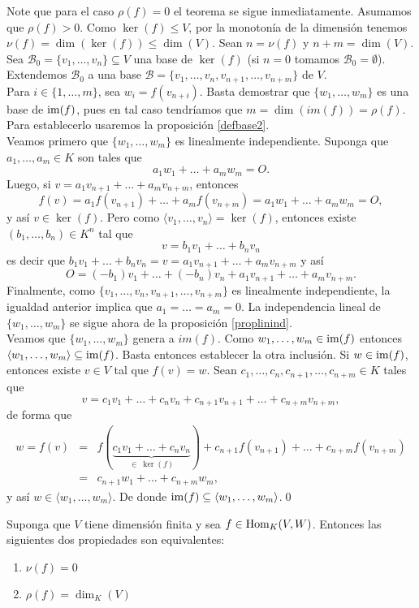 \dem Note que para el caso $\rho(f)=0$ el teorema se sigue inmediatamente. Asumamos que $\rho(f)>0$. Como $\ker(f)\le V$, por la monoton\'ia de la dimensi\'on tenemos $\nu(f)=\dim\left(\ker(f)\right)\le\dim(V)$. Sean $n=\nu(f)$ y $n+m=\dim (V)$. Sea $\mathcal{B}_0=\{v_1,\ldots,v_n\}\subseteq V$ una base de $\ker(f)$ (si $n=0$ tomamos $\mathcal{B}_0=\emptyset$). Extendemos $\mathcal{B}_0$ a una base $\mathcal{B}=\{v_1,\ldots,v_n,v_{n+1},\ldots,v_{n+m}\}$ de $V$.\\
Para $i\in\{1,\ldots,m\}$, sea $w_i=f(v_{n+i})$. Basta demostrar que $\{w_1,\ldots,w_m\}$ es una base de $\operatorname{im}(f)$, pues en tal caso tendr\'iamos que $m=\dim\left(im(f)\right)=\rho(f)$. Para establecerlo usaremos la proposici\'on \ref{defbase2}.\\
Veamos primero que $\{w_1,\ldots,w_m\}$ es linealmente independiente. Suponga que $a_1,\ldots,a_m\in K$ son tales que
\[
a_1w_1+\ldots+a_mw_m=O.
\]
Luego, si $v=a_1v_{n+1}+\ldots+a_mv_{n+m}$, entonces
\[
f(v)=a_1f(v_{n+1})+\ldots+a_mf(v_{n+m})=a_1w_1+\ldots+a_mw_m=O,
\]
y as\'i $v\in\ker(f)$. Pero como $\langle v_1,\ldots,v_n\rangle=\ker(f)$, entonces existe $(b_1,\ldots,b_n)\in K^n$ tal que
\[
v=b_1v_1+\ldots+b_nv_n
\]
es decir que $b_1v_1+\ldots+b_nv_n=v=a_1v_{n+1}+\ldots+a_mv_{n+m}$ y as\'i
\[
O=(-b_1)v_1+\ldots+(-b_n)v_n+a_1v_{n+1}+\ldots+a_mv_{n+m}.
\]
Finalmente, como $\{v_1,\ldots,v_n,v_{n+1},\ldots,v_{n+m}\}$ es linealmente independiente, la igualdad anterior implica que $a_1=\ldots=a_m=0$. La independencia lineal de $\{w_1,\ldots,w_m\}$ se sigue ahora de la  proposici\'on \ref{proplinind}.\\
Veamos que  $\{w_1,\ldots,w_m\}$ genera a $im(f)$. Como $w_1,\ldots,w_m\in \operatorname{im}(f)$ entonces $\langle w_1,\ldots,w_m\rangle\subseteq\operatorname{im}(f)$. Basta entonces establecer la otra inclusi\'on. Si $w\in\operatorname{im}(f)$, entonces existe $v\in V$ tal que $f(v)=w$. Sean $c_1,\ldots,c_n,c_{n+1},\ldots,c_{n+m}\in K$ tales que 
\[
v=c_1v_1+\ldots+c_nv_n+c_{n+1}v_{n+1}+\ldots+c_{n+m}v_{n+m},
\]
de forma que
\begin{eqnarray*}
w=f(v) & = & f(\underbrace{c_1v_1+\ldots+c_nv_n}_{\in\ \ker(f)})+c_{n+1}f(v_{n+1})+\ldots+c_{n+m}f(v_{n+m})\\
           & = & c_{n+1}w_1+\ldots+c_{n+m}w_m,
\end{eqnarray*}
y as\'i $w\in\langle w_1,\ldots,w_m\rangle$. De donde $\operatorname{im}(f)\subseteq\langle w_1,\ldots,w_m\rangle$.\qed

\begin{coro}\label{corteorango}
Suponga que $V$ tiene dimensi\'on finita y sea $f\in\operatorname{Hom}_K(V,W)$. Entonces las siguientes dos propiedades son equivalentes:
\begin{enumerate}
\item $\nu(f)=0$
\item $\rho(f)=\dim_K(V)$
\end{enumerate}
\end{coro}


